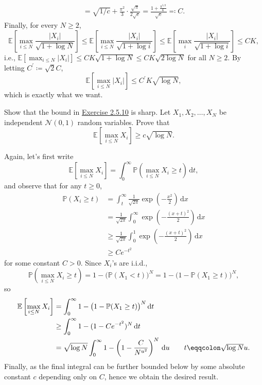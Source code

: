 \begin{answer}
\begin{align*}
		= \sqrt{1 / c} + \frac{\pi ^2}{3} \cdot \frac{\sqrt{\pi } }{2 \sqrt{c} }
		= \frac{1 + \frac{\pi^{5 / 2}}{6}}{\sqrt{c}}
		\eqqcolon C.
	\end{align*}
	Finally, for every \(N \geq 2\),
	\[
		\mathbb{E}\left[\max _{i \leq N} \frac{\vert X_i \vert }{\sqrt{1 + \log N} }\right]
		\leq \mathbb{E}\left[\max _{i \leq N} \frac{\vert X_i \vert }{\sqrt{1 + \log i} }\right]
		\leq \mathbb{E}\left[\max _i \frac{\vert X_i \vert }{\sqrt{1 + \log i} }\right]
		\leq CK,
	\]
	i.e., \(\mathbb{E}[\max _{i \leq N} \vert X_i \vert ] \leq CK \sqrt{1 + \log N} \leq CK \sqrt{2 \log N}  \) for all \(N \geq 2\). By letting \(C^{\prime} \coloneqq \sqrt{2} C\),
	\[
		\mathbb{E}\left[\max _{i \leq N} \vert X_i \vert \right]
		\leq C^{\prime} K \sqrt{\log N} ,
	\]
	which is exactly what we want.
\end{answer}

\begin{problem*}[Exercise 2.5.11]\label{ex2.5.11}
	Show that the bound in \hyperref[ex2.5.10]{Exercise 2.5.10} is sharp. Let \(X_1, X_2, \dots , X_N\) be independent \(\mathcal{N} (0, 1)\) random variables. Prove that
	\[
		\mathbb{E}_{}\left[\max _{i \leq N} X_i\right]
		\geq c \sqrt{\log N} .
	\]
\end{problem*}
\begin{answer}
	Again, let's first write
	\[
		\mathbb{E}\left[\max _{i \leq N} X_i \right]
		= \int_{0}^{\infty} \mathbb{P}\left( \max _{i \leq N} X_i \geq t \right) \,\mathrm{d}t,
	\]
	and observe that for any \(t \geq 0\),
	\begin{align*}
		\mathbb{P}(X_i \geq t)
		 & = \int_{t}^{\infty} \frac{1}{\sqrt{2\pi } } \exp (-\frac{x^2}{2})\,\mathrm{d}x                                              \\
		 & = \frac{1}{\sqrt{2\pi } }\int_{0}^{\infty} \exp \left( - \frac{(x + t)^2}{2} \right) \,\mathrm{d}x \tag*{\(x \gets x + t\)} \\
		 & \geq \frac{1}{\sqrt{2\pi } }\int_{0}^{1} \exp \left( - \frac{(x + t)^2}{2} \right) \,\mathrm{d}x                            \\
		 & \geq C e^{-t^2}
	\end{align*}
	for some constant \(C > 0\). Since \(X_i\)'s are i.i.d.,
	\[
		\mathbb{P}\left( \max _{i \leq N} X_i \geq t \right)
		= 1 - \big(\mathbb{P}(X_1 < t) \big)^N
		= 1 - \big(1 - \mathbb{P}(X_1 \geq t) \big)^N,
	\]
	so
	\begin{align*}
		\mathbb{E}\left[\max _{i \leq N} X_i \right]
		 & = \int_{0}^{\infty} 1 - \big(1 - \mathbb{P}(X_1 \geq t) \big)^N \,\mathrm{d}t                                                        \\
		 & \geq \int_{0}^{\infty} 1 - (1 - Ce^{-t^2})^N \,\mathrm{d}t                                                                           \\
		 & = \sqrt{\log N} \int_{0}^{\infty} 1 - \left( 1 - \frac{C}{N^{u^2}} \right) ^N \,\mathrm{d}u \tag*{\(t \eqqcolon \sqrt{\log N} u \)}.
	\end{align*}
	Finally, as the final integral can be further bounded below by some absolute constant \(c\) depending only on \(C\), hence we obtain the desired result.
\end{answer}